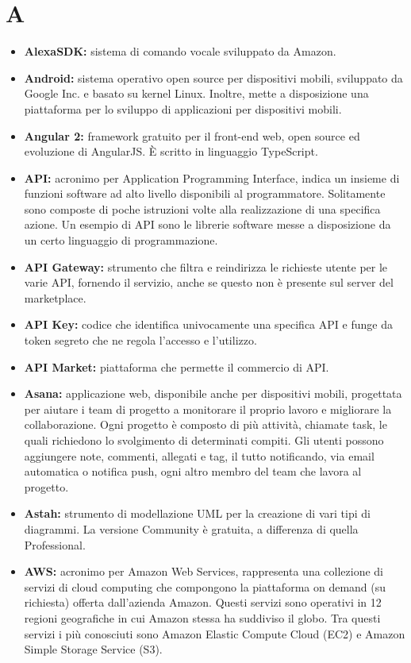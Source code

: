 \newpage
\section{A}

\begin{itemize}
	\item \textbf{AlexaSDK:} sistema di comando vocale sviluppato da Amazon.
	\item \textbf{Android:} sistema operativo open source per dispositivi mobili, sviluppato da Google Inc. e basato su kernel Linux. Inoltre, mette a disposizione una piattaforma per lo sviluppo di applicazioni per dispositivi mobili.
	\item \textbf{Angular 2:} framework gratuito per il front-end web, open source ed evoluzione di AngularJS. \MakeUppercase{è} scritto in linguaggio TypeScript.
	\item \textbf{API:} acronimo per Application Programming Interface, indica un insieme di funzioni software ad alto livello disponibili al programmatore. Solitamente sono composte di poche istruzioni volte alla realizzazione di una specifica azione. Un esempio di API sono le librerie software messe a disposizione da un certo linguaggio di programmazione.
	\item \textbf{API Gateway:} strumento che filtra e reindirizza le richieste utente per le varie API, fornendo il servizio, anche se questo non è presente sul server del marketplace.
	\item \textbf{API Key:} codice che identifica univocamente una specifica API e funge da token segreto che ne regola l'accesso e l'utilizzo.
	\item \textbf{API Market:} piattaforma che permette il commercio di API.
	\item \textbf{Asana:} applicazione web, disponibile anche per dispositivi mobili, progettata per aiutare i team di progetto a monitorare il proprio lavoro e migliorare la collaborazione. Ogni progetto è composto di più attività, chiamate task, le quali richiedono lo svolgimento di determinati compiti. Gli utenti possono aggiungere note, commenti, allegati e tag, il tutto notificando, via email automatica o notifica push, ogni altro membro del team che lavora al progetto.
	\item \textbf{Astah:} strumento di modellazione UML per la creazione di vari tipi di diagrammi. La versione Community è gratuita, a differenza di quella Professional.
	\item \textbf{AWS:} acronimo per Amazon Web Services, rappresenta una collezione di servizi di cloud computing che compongono la piattaforma on demand (su richiesta) offerta dall'azienda Amazon. Questi servizi sono operativi in 12 regioni geografiche in cui Amazon stessa ha suddiviso il globo. Tra questi servizi i più conosciuti sono Amazon Elastic Compute Cloud (EC2) e Amazon Simple Storage Service (S3).

\end{itemize}
